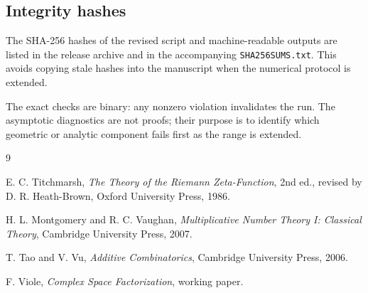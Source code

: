 \documentclass[11pt]{article}
\theoremstyle{definition}
\theoremstyle{remark}
\newcommand{\1}{\mathbf{1}}
\begin{document}
\subsection{Integrity hashes}

The SHA-256 hashes of the revised script and machine-readable outputs
are listed in the release archive and in the accompanying
\texttt{SHA256SUMS.txt}.  This avoids copying stale hashes into the
manuscript when the numerical protocol is extended.

The exact checks are binary: any nonzero violation invalidates the run.
The asymptotic diagnostics are not proofs; their purpose is to identify
which geometric or analytic component fails first as the range is
extended.

\begin{thebibliography}{9}

E. C. Titchmarsh,
\emph{The Theory of the Riemann Zeta-Function},
2nd ed., revised by D. R. Heath-Brown,
Oxford University Press, 1986.

H. L. Montgomery and R. C. Vaughan,
\emph{Multiplicative Number Theory I: Classical Theory},
Cambridge University Press, 2007.

T. Tao and V. Vu,
\emph{Additive Combinatorics},
Cambridge University Press, 2006.

F. Viole,
\emph{Complex Space Factorization},
working paper.

\end{thebibliography}
\end{document}
